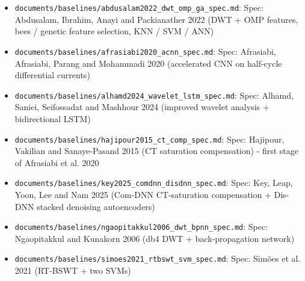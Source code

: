 \begin{itemize}
\item \texttt{documents/baselines/abdusalam2022\_dwt\_omp\_ga\_spec.md}:  Spec: Abdusalam, Ibrahim, Anayi and Packianather 2022 (DWT + OMP features, bees / genetic feature selection, KNN / SVM / ANN)
\item \texttt{documents/baselines/afrasiabi2020\_acnn\_spec.md}:  Spec: Afrasiabi, Afrasiabi, Parang and Mohammadi 2020 (accelerated CNN on half-cycle differential currents)
\item \texttt{documents/baselines/alhamd2024\_wavelet\_lstm\_spec.md}:  Spec: Alhamd, Saniei, Seifossadat and Mashhour 2024 (improved wavelet analysis + bidirectional LSTM)
\item \texttt{documents/baselines/hajipour2015\_ct\_comp\_spec.md}:  Spec: Hajipour, Vakilian and Sanaye-Pasand 2015 (CT saturation compensation) - first stage of Afrasiabi et al. 2020
\item \texttt{documents/baselines/key2025\_comdnn\_disdnn\_spec.md}:  Spec: Key, Leap, Yoon, Lee and Nam 2025 (Com-DNN CT-saturation compensation + Dis-DNN stacked denoising autoencoders)
\item \texttt{documents/baselines/ngaopitakkul2006\_dwt\_bpnn\_spec.md}:  Spec: Ngaopitakkul and Kunakorn 2006 (db4 DWT + back-propagation network)
\item \texttt{documents/baselines/simoes2021\_rtbswt\_svm\_spec.md}:  Spec: Simões et al. 2021 (RT-BSWT + two SVMs)
\end{itemize}